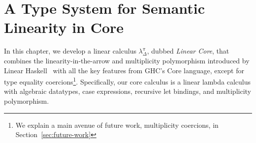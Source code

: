 \documentclass[acmsmall,review]{acmart}
\begin{document}
  

\section{A Type System for Semantic Linearity in Core\label{sec:main:linear-core}}

In this chapter, we develop a linear calculus $\lambda_\Delta^\pi$, dubbed \emph{Linear Core}, that 
combines the linearity-in-the-arrow and multiplicity polymorphism introduced by
Linear Haskell~\cite{cite:linearhaskell} with all the key features from GHC's Core
language, except for type equality coercions\footnote{We explain a main avenue of
future work, multiplicity coercions, in Section~\ref{sec:future-work}}.
%
Specifically, our core calculus is a linear lambda calculus with algebraic
datatypes, case expressions, recursive let bindings, and multiplicity
polymorphism.
\end{document}
